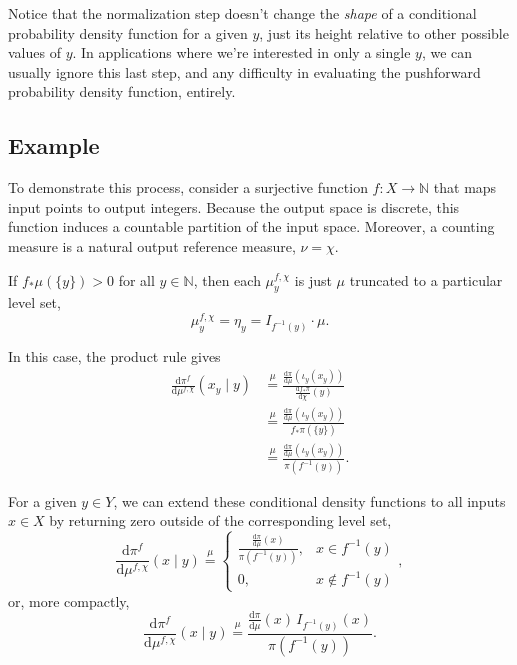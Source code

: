 \documentclass[
  letterpaper,
  DIV=11,
  numbers=noendperiod]{scrartcl}
\begin{document}
Notice that the normalization step doesn't change the \emph{shape} of a
conditional probability density function for a given \(y\), just its
height relative to other possible values of \(y\). In applications where
we're interested in only a single \(y\), we can usually ignore this last
step, and any difficulty in evaluating the pushforward probability
density function, entirely.

\subsection{Example}\label{example}

To demonstrate this process, consider a surjective function
\(f : X \rightarrow \mathbb{N}\) that maps input points to output
integers. Because the output space is discrete, this function induces a
countable partition of the input space. Moreover, a counting measure is
a natural output reference measure, \(\nu = \chi\).

If \(f_{*} \mu( \{ y \} ) > 0\) for all \(y \in \mathbb{N}\), then each
\(\mu^{f, \chi}_{y}\) is just \(\mu\) truncated to a particular level
set, \[
\mu^{f, \chi}_{y} = \eta_{y} = I_{f^{-1}(y)} \cdot \mu.
\]

In this case, the product rule gives \begin{align*}
\frac{ \mathrm{d}  \pi^{f} }{ \mathrm{d}  \mu^{f, \chi}  } (x_{y} \mid y)
&\overset{ \mu }{ = }
\frac{
  \frac{ \mathrm{d} \pi}{ \mathrm{d} \mu }( \iota_{y}(x_{y}) )
}{
  \frac{ \mathrm{d}  f_{*} \pi }{ \mathrm{d} \chi }(y)
}
\\
&\overset{ \mu }{ = }
\frac{
  \frac{ \mathrm{d} \pi}{ \mathrm{d} \mu }( \iota_{y}(x_{y}) )
}{
  f_{*} \pi ( \{ y \} )
}
\\
&\overset{ \mu }{ = }
\frac{
  \frac{ \mathrm{d} \pi}{ \mathrm{d} \mu }( \iota_{y}(x_{y}) )
}{
  \pi ( f^{-1}(y) )
}.
\end{align*}

For a given \(y \in Y\), we can extend these conditional density
functions to all inputs \(x \in X\) by returning zero outside of the
corresponding level set, \[
\frac{ \mathrm{d}  \pi^{f} }{ \mathrm{d}  \mu^{f, \chi}  } (x \mid y)
\overset{ \mu }{ = }
\left\{
\begin{array}{rr}
\frac{ \frac{ \mathrm{d} \pi}{ \mathrm{d} \mu }(x) }{ \pi ( f^{-1}(y) ) },
& x \in f^{-1}(y)
\\
0,
& x \notin f^{-1}(y)
\end{array}
\right. ,
\] or, more compactly, \[
\frac{ \mathrm{d}  \pi^{f} }{ \mathrm{d}  \mu^{f, \chi}  } (x \mid y)
\overset{ \mu }{ = }
\frac{
  \frac{ \mathrm{d} \pi}{ \mathrm{d} \mu }(x) \, I_{f^{-1}(y)}(x)
}{
  \pi ( f^{-1}(y) )
}.
\]
\end{document}
